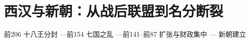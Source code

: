 \chapter{西汉与新朝：从战后联盟到名分断裂}
\label{ch:han-shared-chronology}

\begin{center}
\small 前206 \quad 十八王分封 \quad\textcolor{timeline}{—}\quad 前154 \quad 七国之乱 \quad\textcolor{timeline}{—}\quad 前141--前87 \quad 扩张与财政集中 \quad\textcolor{timeline}{—} \quad 新朝建立
\end{center}













